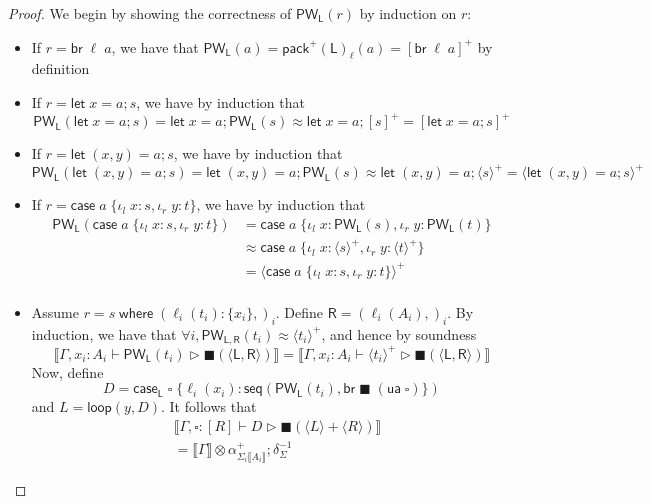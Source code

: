 \documentclass[acmsmall,screen,review]{acmart}
\newcommand{\ms}[1]{\ensuremath{\mathsf{#1}}}
\newcommand{\lto}{:}
\newcommand{\linl}[1]{\iota_l\;{#1}}
\newcommand{\linr}[1]{\iota_r\;{#1}}
\newcommand{\letstmt}[3]{\ensuremath{\ms{let}\;#1 = #2; #3}}
\newcommand{\brb}[2]{\ms{br}\;#1\;#2}
\newcommand{\casestmt}[5]{\ms{case}\;#1\;\{\linl{#2} \lto #3, \linr{#4} \lto #5\}}
\newcommand{\where}[2]{#1\;\ms{where}\;#2}
\newcommand{\wbranch}[3]{#1(#2) \lto \{#3\}}
\newcommand{\bhyp}[2]{#1 : #2}
\newcommand{\haslb}[3]{#1 \vdash #2 \rhd #3}
\newcommand{\teqv}{\approx}
\newcommand{\topwhile}[2]{\ms{PW}_{#1}(#2)}
\newcommand{\dnt}[1]{\llbracket{#1}\rrbracket}
\newcommand{\invar}{\square}
\newcommand{\outlb}{\blacksquare}
\newcommand{\pckd}[1]{\langle #1 \rangle}
\begin{document}
\begin{proof}
  We begin by showing the correctness of $\topwhile{\ms{L}}{r}$ by induction on $r$:
  \begin{itemize}
    \item If $r = \brb{\ell}{a}$, we have that 
    $\topwhile{\ms{L}}{a} = \ms{pack}^+(\ms{L})_\ell(a) = [\brb{\ell}{a}]^+$
    by definition
    \item If $r = \letstmt{x}{a}{s}$, we have by induction that
    $$
    \topwhile{\ms{L}}{\letstmt{x}{a}{s}} 
    = \letstmt{x}{a}{\topwhile{\ms{L}}{s}}
    \teqv \letstmt{x}{a}{[s]^+}
    = [\letstmt{x}{a}{s}]^+
    $$
    \item If $r = \letstmt{(x, y)}{a}{s}$, we have by induction that
    $$
    \topwhile{\ms{L}}{\letstmt{(x, y)}{a}{s}} 
    = \letstmt{(x, y)}{a}{\topwhile{\ms{L}}{s}}
    \teqv \letstmt{(x, y)}{a}{\pckd{s}^+}
    = \pckd{\letstmt{(x, y)}{a}{s}}^+
    $$
    \item If $r = \casestmt{a}{x}{s}{y}{t}$, we have by induction that
    $$
    \begin{aligned}
    \topwhile{\ms{L}}{\casestmt{a}{x}{s}{y}{t}}
    &= \casestmt{a}{x}{\topwhile{\ms{L}}{s}}{y}{\topwhile{\ms{L}}{t}} \\
    &\teqv \casestmt{a}{x}{\pckd{s}^+}{y}{\pckd{t}^+} \\
    &= \pckd{\casestmt{a}{x}{s}{y}{t}}^+ \\
    \end{aligned}
    $$
    \item Assume $r = \where{s}{(\wbranch{\ell_i}{t_i}{x_i},)_i}$. %
    Define $\ms{R} = (\ell_i(A_i),)_i$.
    By induction, we have that $\forall i, \topwhile{\ms{L}, \ms{R}}{t_i} \teqv \pckd{t_i}^+$, and
    hence by soundness
    \begin{equation}
      \dnt{\haslb{\Gamma, \bhyp{x_i}{A_i}}{\topwhile{\ms{L}}{t_i}}{\outlb(\pckd{\ms{L}, \ms{R}})}}
      = \dnt{\haslb{\Gamma, \bhyp{x_i}{A_i}}{\pckd{t_i}^+}{\outlb(\pckd{\ms{L}, \ms{R}})}}
    \end{equation}
    Now, define
    $$
    D = \ms{case}_{\ms{L}}\;\invar\;
    \{\ell_i(x_i) : \ms{seq}(\topwhile{\ms{L}}{t_i}, \brb{\outlb}{(\ms{ua}\;\invar)}\})
    $$
    and $L = \ms{loop}(y, D)$. %
    It follows that
    \begin{equation}
      \begin{aligned}
      & \dnt{\haslb{\Gamma, \invar : [R]}{D}{\outlb(\pckd{L} + \pckd{R})}} \\
      & = \dnt{\Gamma} \otimes \alpha^+_{\Sigma_i\dnt{A_i}} ; \delta^{-1}_{\Sigma}

\end{aligned}
\end{equation}
\end{itemize}
\end{proof}
\end{document}
